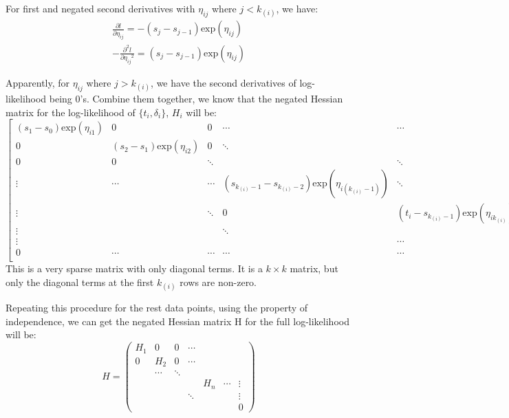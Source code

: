 \documentclass[]{article}
\begin{document}
For first and negated second derivatives with \(\eta_{ij}\) where
\(j<k_{(i)}\), we have:
\begin{equation}\begin{aligned}\label{eqn:hessian2}
\frac{\partial l}{\partial \eta_{ij}}= -(s_{j}-s_{j-1})\text{exp}(\eta_{ij})\\
-\frac{\partial^2 l}{\partial {\eta_{ij}}^2} = (s_{j}-s_{j-1})\text{exp}(\eta_{ij})
\end{aligned}\end{equation}

Apparently, for \(\eta_{ij}\) where \(j>k_{(i)}\), we have the second
derivatives of log-likelihood being 0's. Combine them together, we know
that the negated Hessian matrix for the log-likelihood of
\(\{t_i,\delta_i\}\), \(H_i\) will be: \begin{equation}
\begin{bmatrix}
(s_1-s_0)\text{exp}(\eta_{i1})  & 0  & 0 & \cdots & \cdots & \cdots & 0 \\
0  & (s_2-s_1)\text{exp}(\eta_{i2})  & 0  & \ddots & && &  \\
0 & 0  & \ddots &   & \ddots & &  &  \\
\vdots & \cdots & \cdots & (s_{k_{(i)}-1}-s_{k_{(i)}-2})\text{exp}(\eta_{i(k_{(i)}-1)}) & \ddots & \vdots &  &  \\
\vdots & & \ddots & 0 & (t_i-s_{k_{(i)}-1})\text{exp}(\eta_{ik_{(i)}}) & \cdots & \vdots& \\
\vdots  & & & \ddots &   & \ddots  &  \vdots\\
\vdots  & && & \cdots & \cdots & \vdots\\
0 & \cdots &  \cdots & \cdots & \cdots & \cdots & 0\\
\end{bmatrix}
\end{equation} This is a very sparse matrix with only diagonal terms. It
is a \(k\times k\) matrix, but only the diagonal terms at the first
\(k_{(i)}\) rows are non-zero.

Repeating this procedure for the rest data points, using the property of
independence, we can get the negated Hessian matrix H for the full
log-likelihood will be: \begin{equation}
H = \begin{pmatrix} 
H_1 & 0 & 0 & \cdots & & \\ 
0 & H_2 & 0 & \cdots & & \\
  & \cdots & \ddots &  & & \\
& & & & H_n & \cdots & \vdots \\ 
& & & \ddots & &&\vdots \\
& & & & & & 0
\end{pmatrix}
\end{equation}
\end{document}
